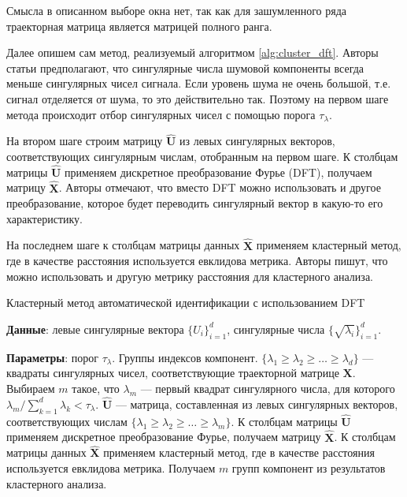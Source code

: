 \documentclass[specialist,
               substylefile = spbu.rtx,
               subf,href,colorlinks=true, 12pt]{disser}
\begin{document}
Смысла в описанном выборе окна нет, так как для зашумленного ряда траекторная матрица является матрицей полного ранга.

Далее опишем сам метод, реализуемый алгоритмом \ref{alg:cluster_dft}.
Авторы статьи предполагают, что сингулярные числа шумовой компоненты всегда меньше сингулярных чисел сигнала.
Если уровень шума не очень большой, т.е. сигнал отделяется от шума, то это действительно так. Поэтому на первом шаге метода происходит отбор сингулярных чисел с помощью порога $\tau_\lambda$.

На втором шаге строим матрицу  $\mathbf{\hat U}$ из левых сингулярных векторов, соответствующих сингулярным числам, отобранным на первом шаге. К столбцам матрицы $\mathbf{\hat U}$ применяем дискретное преобразование Фурье (DFT), получаем матрицу $\mathbf{\hat X}$. Авторы отмечают, что вместо DFT можно использовать и другое преобразование, которое будет переводить сингулярный вектор в какую-то его характеристику.

На последнем шаге к столбцам матрицы данных $\mathbf{\hat X}$ применяем кластерный метод, где в качестве расстояния используется евклидова метрика. Авторы пишут, что можно использовать и другую метрику расстояния для кластерного анализа.

 \begin{algorithm}[!hhh]
\caption{Кластерный метод автоматической идентификации с использованием DFT}
\label{alg:cluster_dft}
\begin{algorithmic}[1]
\REQUIRE 
\item \textbf{Данные}: левые сингулярные вектора $\{U_i\}_{i=1}^{d}$, сингулярные числа $\{\sqrt{\lambda_i}\}_{i=1}^{d}$.
\item \textbf{Параметры}: порог $\tau_\lambda$.
\ENSURE Группы индексов компонент.
\STATE  $\{ \lambda_1 \geqslant \lambda_2 \geqslant \ldots \geqslant \lambda_{d}\}$ --- квадраты сингулярных чисел, соответствующие траекторной матрице $\mathbf{X}$. Выбираем $m$ такое, что $\lambda_m$ --- первый квадрат сингулярного числа, для которого $\lambda_m / \sum_{k=1}^{d}\lambda_k < \tau_\lambda$.
\STATE $\mathbf{\hat U}$ --- матрица, составленная из левых сингулярных векторов, соответствующих числам $\{ \lambda_1 \geqslant \lambda_2 \geqslant \ldots \geqslant \lambda_m\}$. К столбцам матрицы $\mathbf{\hat U}$ применяем дискретное преобразование Фурье, получаем матрицу $\mathbf{\hat X}$.
\STATE К столбцам матрицы данных $\mathbf{\hat X}$ применяем кластерный метод, где в качестве расстояния используется евклидова метрика.
\STATE Получаем $m$ групп компонент из результатов кластерного анализа.
\end{algorithmic}
\end{algorithm}
\end{document}
